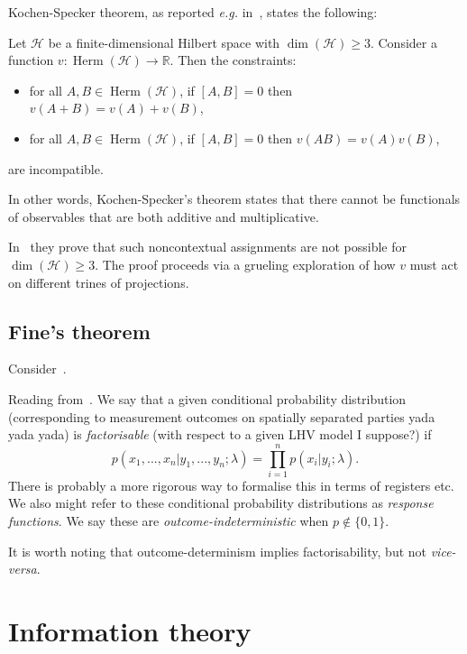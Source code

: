 \documentclass[12pt]{report}
\newcommand{\RR}{\mathbb{R}}
\newcommand{\on}[1]{\operatorname{#1}}
\newcommand{\calH}{{\mathcal{H}}}
\DeclareMathOperator{\Herm}{Herm}
\begin{document}
Kochen-Specker theorem, as reported \emph{e.g.} in~\parencite{moretti2019fundamental}, states the following:
\begin{prop}[KS theorem]
	Let $\calH$ be a finite-dimensional Hilbert space with $\dim(\calH)\ge3$.
	Consider a function $v:\Herm(\calH)\to\RR$.
	Then the constraints:
	\begin{itemize}
		\item for all $A,B\in\Herm(\calH)$, if $[A,B]=0$ then $v(A+B)=v(A)+v(B)$,
		\item for all $A,B\in\Herm(\calH)$, if $[A,B]=0$ then $v(AB)=v(A)v(B)$,
	\end{itemize}
	are incompatible.
\end{prop}
In other words, Kochen-Specker's theorem states that there cannot be functionals of observables that are both additive and multiplicative.

In~\parencite{cabello1994simple} they prove that such noncontextual assignments are not possible for $\on{dim}(\calH)\ge3$. The proof proceeds via a grueling exploration of how $v$ must act on different trines of projections.

\section{Fine's theorem}

Consider~\parencite{fine1982hidden}.


Reading from~\parencite{kunjwal2015fine}.
We say that a given conditional probability distribution (corresponding to measurement outcomes on spatially separated parties yada yada yada) is \emph{factorisable} (with respect to a given LHV model I suppose?) if
\begin{equation}
	p(x_1,...,x_n|y_1,...,y_n;\lambda)
	= \prod_{i=1}^n p(x_i|y_i;\lambda).
\end{equation}
There is probably a more rigorous way to formalise this in terms of registers etc.
We also might refer to these conditional probability distributions as \emph{response functions}.
We say these are \emph{outcome-indeterministic} when $p\notin\{0,1\}$.

It is worth noting that outcome-determinism implies factorisability, but not \emph{vice-versa}.

\chapter{Information theory}
\end{document}
